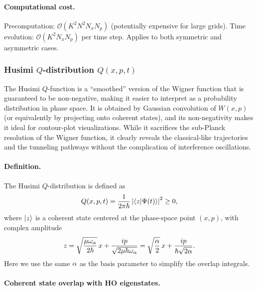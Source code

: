 \paragraph{Computational cost.}
Precomputation: $\mathcal{O}(K^2 N^2 N_x N_p)$ (potentially expensive for large grids).
Time evolution: $\mathcal{O}(K^2 N_x N_p)$ per time step.
Applies to both symmetric and asymmetric cases.

\subsubsection{Husimi $Q$-distribution $Q(x,p,t)$}\label{sec:husimi}

\begin{remark}
The Husimi $Q$-function is a ``smoothed'' version of the Wigner function that is guaranteed to be non-negative, making it easier to interpret as a probability distribution in phase space.
It is obtained by Gaussian convolution of $W(x,p)$ (or equivalently by projecting onto coherent states), and its non-negativity makes it ideal for contour-plot visualizations.
While it sacrifices the sub-Planck resolution of the Wigner function, it clearly reveals the classical-like trajectories and the tunneling pathways without the complication of interference oscillations.
\end{remark}

\paragraph{Definition.}

The Husimi $Q$-distribution is defined as
\begin{equation}\label{eq:husimi_def}
  Q(x,p,t) = \frac{1}{2\pi\hbar}\left|\braket{z}{\Psi(t)}\right|^2 \geq 0,
\end{equation}
where $\ket{z}$ is a coherent state centered at the phase-space point $(x,p)$, with complex amplitude
\begin{equation}\label{eq:z_def}
  z = \sqrt{\frac{\mu\omega_\alpha}{2\hbar}}\,x + \frac{ip}{\sqrt{2\mu\hbar\omega_\alpha}}
  = \sqrt{\frac{\alpha}{2}}\,x + \frac{ip}{\hbar\sqrt{2\alpha}}.
\end{equation}
Here we use the same $\alpha$ as the basis parameter to simplify the overlap integrals.

\paragraph{Coherent state overlap with HO eigenstates.}

